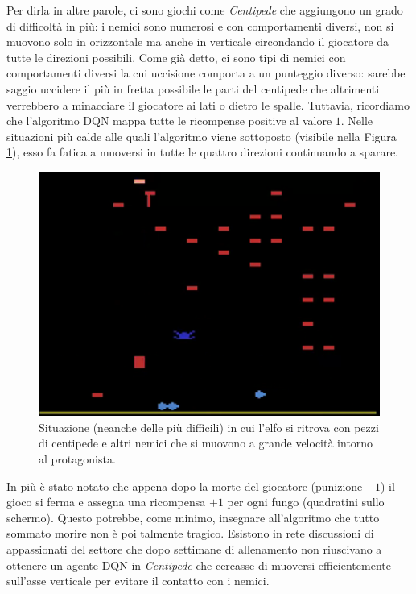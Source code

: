 \documentclass[twoside,twocolumn,10pt]{extarticle}
\theoremstyle{definition}
\begin{document}
		Per dirla in altre parole, ci sono giochi come \textit{Centipede} che aggiungono un grado di difficoltà in più: i nemici sono numerosi e con comportamenti diversi, non si muovono solo in orizzontale ma anche in verticale circondando il giocatore da tutte le direzioni possibili. Come già detto, ci sono tipi di nemici con comportamenti diversi la cui uccisione comporta a un punteggio diverso: sarebbe saggio uccidere il più in fretta possibile le parti del centipede che altrimenti verrebbero a minacciare il giocatore ai lati o dietro le spalle. Tuttavia, ricordiamo che l'algoritmo DQN mappa tutte le ricompense positive al valore $1$. Nelle situazioni più calde alle quali l'algoritmo viene sottoposto (visibile nella Figura \ref{fig:centipede}), esso fa fatica a muoversi in tutte le quattro direzioni continuando a sparare.
		\begin{figure}[t]
			\centering
			\includegraphics[scale=.5]{images/centipede1.png}
			\caption{Situazione (neanche delle più difficili) in cui l'elfo si ritrova con pezzi di centipede e altri nemici che si muovono a grande velocità intorno al protagonista.}
			\label{fig:centipede}
		\end{figure}
		In più è stato notato che appena dopo la morte del giocatore (punizione $-1$) il gioco si ferma e assegna una ricompensa $+1$ per ogni fungo (quadratini sullo schermo). Questo potrebbe, come minimo, insegnare all'algoritmo che tutto sommato morire non è poi talmente tragico. Esistono in rete discussioni di appassionati del settore che dopo settimane di allenamento non riuscivano a ottenere un agente DQN in \textit{Centipede} che cercasse di muoversi efficientemente sull'asse verticale per evitare il contatto con i nemici.
\end{document}
